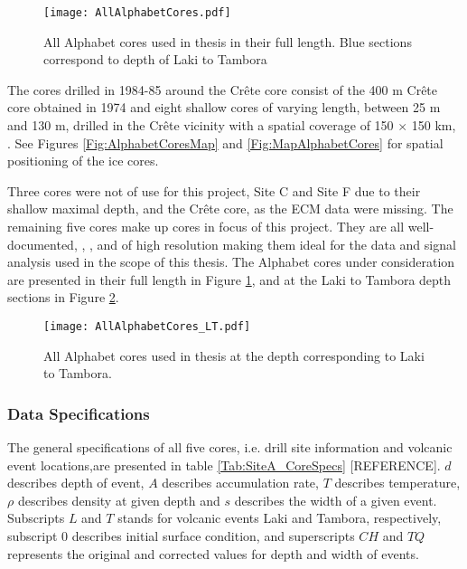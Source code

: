 \documentclass[../../CompleteThesis2/Complete_2ndDraft]{subfiles}
\begin{document}
\begin{figure}[!htb]
	\centering
	\texttt{[image: AllAlphabetCores.pdf]}
	\caption[All Alphabet core $\delta^{18}$O profiles in full.]{\small All Alphabet cores used in thesis in their full length. Blue sections correspond to depth of Laki to Tambora}
	\label{fig:AllAlphabetCores}
\end{figure}

The cores drilled in 1984-85 around the Crête core consist of the 400 m Crête core obtained in 1974 \cite{bibid} and eight shallow cores of varying length, between 25 m and 130 m, drilled in the Crête vicinity with a spatial coverage of 150 $\times$ 150 km, \cite[Clausen, Gundestrup, Johnsen 1988]{Clausen1988}. See Figures \ref{Fig:AlphabetCoresMap} and \ref{Fig:MapAlphabetCores} for spatial positioning of the ice cores.

Three cores were not of use for this project, Site C and Site F due to their shallow maximal depth, and the Crête core, as the ECM data were missing.
The remaining five cores make up cores in focus of this project. They are all well-documented, \cite[Clausen \& Hammer, 1988]{ClausenHammer1988}, \cite[Clausen, Gundestrup, Johnsen 1988]{Clausen1988}, and of high resolution making them ideal for the data and signal analysis used in the scope of this thesis. The Alphabet cores under consideration are presented in their full length in Figure \ref{fig:AllAlphabetCores}, and at the Laki to Tambora depth sections in Figure \ref{fig:AllAlphabetCores_LT}.


\begin{figure}[h]
	\centering
	\texttt{[image: AllAlphabetCores\_LT.pdf]}
	\caption[All Alphabet core $\delta^{18}$O profiles, depths from Laki to Tambora.]{\small All Alphabet cores used in thesis at the depth corresponding to Laki to Tambora.}
	\label{fig:AllAlphabetCores_LT}
\end{figure}



\subsubsection[Data Specifications][Data Specifications]{Data Specifications}
\label{Subsubsec:Data_Selection_Alhabet_Specifications}

The general specifications of all five cores, i.e. drill site information and volcanic event locations,are presented in table \ref{Tab:SiteA_CoreSpecs} [REFERENCE].
$d$ describes depth of event, $A$ describes accumulation rate, $T$ describes temperature, $\rho$ describes density at given depth and $s$ describes the width of a given event. Subscripts $L$ and $T$ stands for volcanic events Laki and Tambora, respectively, subscript $0$ describes initial surface condition, and superscripts $CH$ and $TQ$ represents the original and corrected values for depth and width of events.
\end{document}
